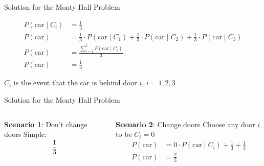 \begin{frame}{Solution for the Monty Hall Problem}
	\begin{idea}
		$$
			\begin{aligned}
				P(\text{car} \mid C_i) & = \frac{1}{3} \\ P(\text{car}) & = \frac{1}{3} \cdot P(\text{car} \mid C_1) + \frac{1}{3} \cdot P(\text{car} \mid C_2) + \frac{1}{3} \cdot P(\text{car} \mid C_3) \\ P(\text{car}) & = \frac{\sum^3_{i=1}P(\text{car} \mid C_i)}{3} \\ P(\text{car}) & = \frac{1}{3}
			\end{aligned}
		$$
	\end{idea}
	\vfill \vfill $C_i$ is the event that the car is behind door $i$, $i=1,2,3$
\end{frame}

\begin{frame}[t]{Solution for the Monty Hall Problem}
	\begin{columns}[t]
		\begin{column}{0.5\textwidth} {\Large \textbf{Scenario 1}: Don't change doors} \newline \newline Simple: $$\frac{1}{3}$$
		\end{column}
		\begin{column}{0.5\textwidth} {\Large \textbf{Scenario 2}: Change doors} \newline \newline Choose any door $i$ to be $C_i = 0$ \vfill $$
				\begin{aligned}
					P(\text{car}) & = 0 \cdot P(\text{car} \mid C_i) + \frac{1}{3} + \frac{1}{3} \\ P(\text{car}) & = \frac{2}{3}
				\end{aligned}
			$$
		\end{column}
	\end{columns}
\end{frame}

